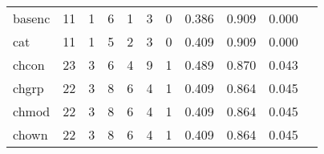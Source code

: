 \begin{longtable}{lp{1.2cm}p{1.2cm}p{1.2cm}p{1.2cm}p{1.2cm}p{1.2cm}p{1.2cm}p{1.2cm}p{1.2cm}p{1.2cm}}
basenc    &                                    11 &                                                  1 &                                                  6 &                                                  1 &                                                  3 &                                                  0 &                                              0.386 &                                              0.909 &                                              0.000 \\
cat       &                                    11 &                                                  1 &                                                  5 &                                                  2 &                                                  3 &                                                  0 &                                              0.409 &                                              0.909 &                                              0.000 \\
chcon     &                                    23 &                                                  3 &                                                  6 &                                                  4 &                                                  9 &                                                  1 &                                              0.489 &                                              0.870 &                                              0.043 \\
chgrp     &                                    22 &                                                  3 &                                                  8 &                                                  6 &                                                  4 &                                                  1 &                                              0.409 &                                              0.864 &                                              0.045 \\
chmod     &                                    22 &                                                  3 &                                                  8 &                                                  6 &                                                  4 &                                                  1 &                                              0.409 &                                              0.864 &                                              0.045 \\
chown     &                                    22 &                                                  3 &                                                  8 &                                                  6 &                                                  4 &                                                  1 &                                              0.409 &                                              0.864 &                                              0.045 \\

\end{longtable}
